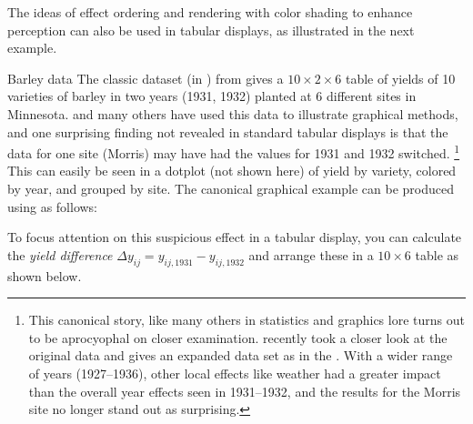 \documentclass[11pt]{book}
\renewenvironment{knitrout}{\small\renewcommand{\baselinestretch}{.85}}{} %
\begin{document}
The ideas of effect ordering and rendering with
color shading to enhance perception can
also be used in tabular displays, as illustrated in the next example.

\begin{Example}[barley]{Barley data}
The classic  dataset (in ) 
from \citet{Immer-etal:34}
gives a $10 \times 2 \times 6$ table of yields
of 10 varieties of barley in two years (1931, 1932)
planted at 6 different sites in Minnesota.
\citet{Cleveland:VisData} and many others have used this data to illustrate
graphical methods, and one
surprising finding not revealed in standard tabular displays
is that the data for one site (Morris) may have had
the values for 1931 and 1932 switched.%
\footnote{
This canonical story, like many others in statistics and graphics lore
turns out to be aprocyophal on closer examination.
\cite{Wright:2013} recently took a closer look at the original data
and gives an expanded data set as 
in the .  With a wider range of years (1927--1936),
other local effects like weather had a greater impact than the 
overall year effects seen in 1931--1932, and the results for the
Morris site no longer stand out as surprising.
}
This can easily be seen in a dotplot (not shown here)
of yield by variety, colored by year, and grouped by site.
The canonical graphical example can be produced
using  as follows:

\begin{knitrout}
\color{fgcolor}\begin{kframe}
\begin{alltt}
 \hlstd{=}\hlstd{)}
\hlstd{(} \hlstd{(}   \hlopt{+}
  \hlstd{()} \hlopt{+}
  \hlstd{(}\hlopt{~}
\end{alltt}
\end{kframe}
\end{knitrout}

To focus attention on this suspicious effect in a tabular display,
you can calculate the \emph{yield difference}
$\Delta y_{ij} = y_{ij,1931} - y_{ij,1932}$ and arrange these
in a $10 \times 6$ table as shown below. 


\end{Example}
\end{document}

